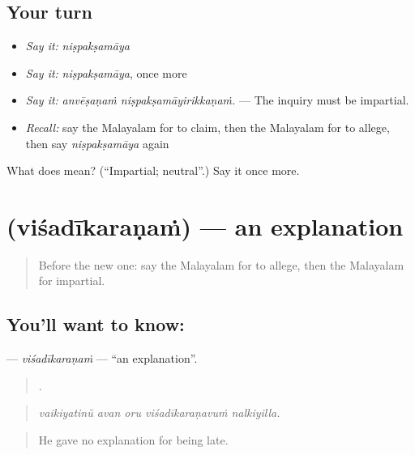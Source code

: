 \subsection*{Your turn}
\begin{itemize}
\raggedright
  \item \emph{Say it:} \emph{niṣpakṣamāya}
  \item \emph{Say it:} \emph{niṣpakṣamāya}, once more
  \item \emph{Say it:} \emph{anvēṣaṇaṁ niṣpakṣamāyirikkaṇaṁ.} — The inquiry must be impartial.
  \item \emph{Recall:} say the Malayalam for to claim, then the Malayalam for to allege, then say \emph{niṣpakṣamāya} again
\end{itemize}

\begin{tcolorbox}[breakable,colback=teal!4,colframe=teal!35!black,title={Before you move on}]
What does  mean? (\textquotedblleft{}Impartial; neutral\textquotedblright{}.) Say it once more.
\end{tcolorbox}
\section[\texorpdfstring{\ml{വിശദീകരണം} (viśadīkaraṇaṁ)}{വിശദീകരണം (viśadīkaraṇaṁ)}]{ (viśadīkaraṇaṁ) — an explanation}

\label{lesson:ML-C409-visadikaranam}



\begin{quote}
Before the new one: say the Malayalam for to allege, then the Malayalam for impartial.
\end{quote}

\subsection*{You'll want to know: }
\textbf{} — \emph{viśadīkaraṇaṁ} — \textquotedblleft{}an explanation\textquotedblright{}.

\begin{quote}
    .
\end{quote}

\begin{quote}
\emph{vaikiyatinŭ avan oru viśadīkaraṇavuṁ nalkiyilla.}
\end{quote}

\begin{quote}
He gave no explanation for being late.
\end{quote}

